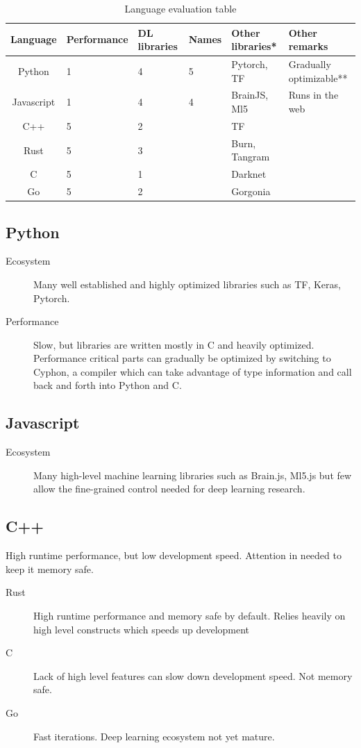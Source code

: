 \documentclass[12pt, a4paper, titlepage]{report}
\begin{document}
\begin{table}
   \begin{tabular} {|c||p{2.2cm}|p{2.2cm}|p{2.5cm}|p{2.2cm}|p{2.2cm}|}
      \hline
      Language    & Performance & DL libraries & Names & Other libraries* & Other remarks \\
      \hline\hline
      Python      & 1 & 4 & 5 & Pytorch, TF & Gradually optimizable** \\ \hline
      Javascript  & 1 & 4 & 4 & BrainJS, Ml5 & Runs in the web \\ \hline
      C++         & 5 & 2 &   & TF &\\ \hline
      Rust        & 5 & 3 &   & Burn, Tangram &\\ \hline
      C           & 5 & 1 &   & Darknet &\\ \hline
      Go          & 5 & 2 &   & Gorgonia &\\
      \hline
   \end{tabular}
   \caption{Language evaluation table}
   \label{table:language_evaluation}
\end{table}

\subsection*{Python}
\begin{description}
   \item[Ecosystem] Many well established and highly optimized libraries such as TF, Keras, Pytorch.
   \item[Performance] Slow, but libraries are written mostly in C and heavily optimized. Performance critical parts can gradually be optimized by switching to Cyphon, a compiler which can take advantage of type information and call back and forth into Python and C.
\end{description}

\subsection*{Javascript}
\begin{description}
   \item[Ecosystem] Many high-level machine learning libraries such as Brain.js, Ml5.js but few allow the fine-grained control needed for deep learning research.
\end{description}


\subsection*{C++} High runtime performance, but low development speed. Attention in needed to keep it memory safe.
\begin{description}
   \item[Rust] High runtime performance and memory safe by default. Relies heavily on high level constructs which speeds up development 
   \item[C] Lack of high level features can slow down development speed. Not memory safe.
   \item[Go] Fast iterations. Deep learning ecosystem not yet mature.
\end{description}
\end{document}
